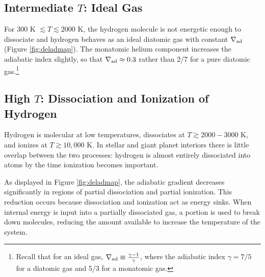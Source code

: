 




\subsection{Intermediate $T$: Ideal Gas}
\label{sec:intT}

For $300$ K $\lesssim T \lesssim 2000$ K, the hydrogen molecule is not energetic enough to dissociate and hydrogen behaves as an ideal diatomic gas with constant $\nabla_{\rm ad}$ (Figure \ref{fig:deladmap}). The monatomic helium component increases the adiabatic index slightly, so that $\nabla_{\rm ad} \approx 0.3$ rather than 2/7 for a pure diatomic gas.\footnote{Recall that for an ideal gas, $\nabla_{\rm ad} \equiv \frac{\gamma-1}{\gamma}$, where the adiabatic index  $\gamma=7/5$ for a diatomic gas and 5/3 for a monatomic gas.}



\subsection{High $T$: Dissociation and Ionization of Hydrogen}

 Hydrogen is molecular at low temperatures, dissociates at $T \gtrsim 2000-3000$ K, and ionizes at  $T \gtrsim 10,000$ K. In stellar and giant planet interiors there is little overlap between the two processes: hydrogen is almost entirely dissociated into atoms by the time ionization becomes important. 

As displayed in Figure \ref{fig:deladmap}, the adiabatic gradient decreases significantly in regions of partial dissociation and partial ionization.  This reduction occurs because dissociation and ionization act as energy sinks.  When internal energy is input into a partially dissociated gas, a portion is used to break down molecules, reducing the amount available to increase the temperature of the system. %

